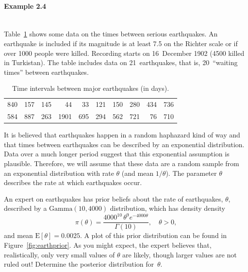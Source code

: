 \paragraph{Example 2.4}{~\\
Table~\ref{tab:earth} shows some data on the times between serious \label{ex:earth} earthquakes. An earthquake is included if its magnitude is at least 7.5 on the Richter scale or if over 1000 people were killed. Recording starts on 16~December 1902 (4500 killed in Turkistan). The table includes data on 21~earthquakes, that is, 20~``waiting times'' between earthquakes. 

\begin{table}[h]
\centering
\begin{tabular}{|rrrrrrrrrr|} \hline
840&157&145&44&33&121&150&280&434&736\\
584&887&263&1901&695&294&562&721&76&710\\ \hline
\end{tabular}
\caption{Time intervals between major earthquakes (in days).}
\label{tab:earth}
\end{table}

It is believed that earthquakes happen in a random haphazard kind of way and that times between earthquakes can be described by an exponential distribution. Data over a much longer period suggest that this exponential assumption is plausible. Therefore, we will assume that these data are a random sample from an exponential distribution with rate $\theta$ (and mean $1/\theta$). The parameter $\theta$ describes the rate at which earthquakes occur. 

An expert on earthquakes has prior beliefs about the rate of earthquakes, $\theta$, described by a $\text{Gamma}(10,4000)$ distribution, which has density
density
\begin{equation}
\label{eq:earthprior}
\pi(\theta)=\frac{4000^{10}\,\theta^9e^{-4000\theta}}{\Gamma(10)}, 
\quad\theta>0, 
\end{equation}
and mean $\text{E}[\theta]=0.0025$. A plot of this prior distribution can be found in Figure~\ref{fig:earthprior}.  As you might expect, the expert believes that, realistically, only very small values of $\theta$ are likely, though larger values are not ruled out!  Determine the posterior distribution for~$\theta$.
\begin{figure}[ht]


\end{figure}}
